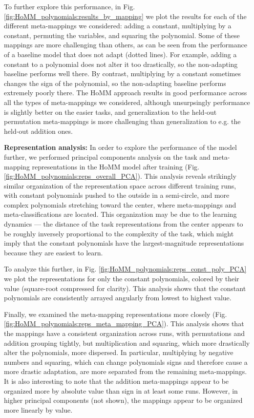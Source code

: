 To further explore this performance, in Fig. \ref{fig:HoMM_polynomials:results_by_mapping} we plot the results for each of the different meta-mappings we considered: adding a constant, multiplying by a constant, permuting the variables, and squaring the polynomial. Some of these mappings are more challenging than others, as can be seen from the performance of a baseline model that does not adapt (dotted lines). For example, adding a constant to a polynomial does not alter it too drastically, so the non-adapting baseline performs well there. By contrast, multiplying by a constant sometimes changes the sign of the polynomial, so the non-adapting baseline performs extremely poorly there. The HoMM approach results in good performance across all the types of meta-mappings we considered, although unsurpsingly performance is slightly better on the easier tasks, and generalization to the held-out permutation meta-mappings is more challenging than generalization to e.g. the held-out addition ones. 

\textbf{Representation analysis:} In order to explore the performance of the model further, we performed principal components analysis on the task and meta-mapping representations in the HoMM model after training (Fig. \ref{fig:HoMM_polynomials:reps_overall_PCA}). This analysis reveals strikingly similar organization of the representation space across different training runs, with constant polynomials pushed to the outside in a semi-circle, and more complex polynomials stretching toward the center, where meta-mappings and meta-classifications are located. This organization may be due to the learning dynamics --- the distance of the task representations from the center appears to be roughly inversely proportional to the complexity of the task, which might imply that the constant polynomials have the largest-magnitude representations because they are easiest to learn. 

To analyze this further, in Fig. \ref{fig:HoMM_polynomials:reps_const_poly_PCA} we plot the representations for only the constant polynomials, colored by their value (square-root compressed for clarity). This analysis shows that the constant polynomials are consistently arrayed angularly from lowest to highest value.

Finally, we examined the meta-mapping representations more closely (Fig. \ref{fig:HoMM_polynomials:reps_meta_mapping_PCA}). This analysis shows that the mappings have a consistent organization across runs, with permutations and addition grouping tightly, but multiplication and squaring, which more drastically alter the polynomials, more dispersed. In particular, multiplying by negative numbers and squaring, which can change polynomials signs and therefore cause a more drastic adaptation, are more separated from the remaining meta-mappings. It is also interesting to note that the addition meta-mappings appear to be organized more by absolute value than sign in at least some runs. However, in higher principal components (not shown), the mappings appear to be organized more linearly by value.  

